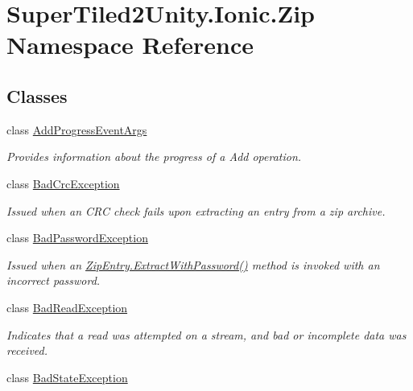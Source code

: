 \hypertarget{namespace_super_tiled2_unity_1_1_ionic_1_1_zip}{}\section{Super\+Tiled2\+Unity.\+Ionic.\+Zip Namespace Reference}
\label{namespace_super_tiled2_unity_1_1_ionic_1_1_zip}
\subsection*{Classes}
\begin{DoxyCompactItemize}
\item 
class \mbox{\hyperlink{class_super_tiled2_unity_1_1_ionic_1_1_zip_1_1_add_progress_event_args}{Add\+Progress\+Event\+Args}}
\begin{DoxyCompactList}\small\item\em Provides information about the progress of a Add operation. \end{DoxyCompactList}\item 
class \mbox{\hyperlink{class_super_tiled2_unity_1_1_ionic_1_1_zip_1_1_bad_crc_exception}{Bad\+Crc\+Exception}}
\begin{DoxyCompactList}\small\item\em Issued when an C\+RC check fails upon extracting an entry from a zip archive. \end{DoxyCompactList}\item 
class \mbox{\hyperlink{class_super_tiled2_unity_1_1_ionic_1_1_zip_1_1_bad_password_exception}{Bad\+Password\+Exception}}
\begin{DoxyCompactList}\small\item\em Issued when an {\ttfamily \mbox{\hyperlink{class_super_tiled2_unity_1_1_ionic_1_1_zip_1_1_zip_entry_a346d1d4eaf4ccb1274fe31629f3cb429}{Zip\+Entry.\+Extract\+With\+Password()}}} method is invoked with an incorrect password. \end{DoxyCompactList}\item 
class \mbox{\hyperlink{class_super_tiled2_unity_1_1_ionic_1_1_zip_1_1_bad_read_exception}{Bad\+Read\+Exception}}
\begin{DoxyCompactList}\small\item\em Indicates that a read was attempted on a stream, and bad or incomplete data was received. \end{DoxyCompactList}\item 
class \mbox{\hyperlink{class_super_tiled2_unity_1_1_ionic_1_1_zip_1_1_bad_state_exception}{Bad\+State\+Exception}}

\end{DoxyCompactItemize}
